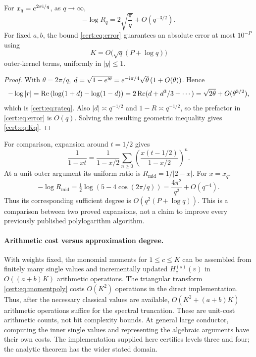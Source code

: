 \begin{corollary}
\label{cert:cor:conductor}
For $x_q=e^{2\pi\mathrm{i}/q}$, as $q\to\infty$,
\begin{equation}
 -\log R_q=2\sqrt{\frac\pi q}+O(q^{-3/2}).
\label{cert:eq:rateq}
\end{equation}
For fixed $a,b$, the bound \eqref{cert:eq:error} guarantees an absolute error
at most $10^{-P}$ using
\begin{equation}
 K=O\bigl(\sqrt q(P+\log q)\bigr)
\label{cert:eq:Kq}
\end{equation}
outer-kernel terms, uniformly in $|y|\le1$.
\end{corollary}
\begin{proof}
With $\theta=2\pi/q$,
$d=\sqrt{1-e^{\mathrm{i}\theta}}
=e^{-\mathrm{i}\pi/4}\sqrt\theta\,(1+O(\theta))$.
Hence
\[
 -\log|r|=\operatorname{Re}\left(\log(1+d)-\log(1-d)\right)
 =2\operatorname{Re}(d+d^3/3+\cdots)
 =\sqrt{2\theta}+O(\theta^{3/2}),
\]
which is \eqref{cert:eq:rateq}. Also $|d|\asymp q^{-1/2}$ and
$1-R\asymp q^{-1/2}$, so the prefactor in \eqref{cert:eq:error} is $O(q)$.
Solving the resulting geometric inequality gives \eqref{cert:eq:Kq}.
\end{proof}

For comparison, expansion around $t=1/2$ gives
\[
 \frac1{1-xt}=\frac1{1-x/2}
 \sum_{n\ge0}\left(\frac{x(t-1/2)}{1-x/2}\right)^n.
\]
At a unit outer argument its uniform ratio is
$R_{\mathrm{mid}}=1/|2-x|$. For $x=x_q$,
\begin{equation}
 -\log R_{\mathrm{mid}}
 =\tfrac12\log(5-4\cos(2\pi/q))
 =\frac{4\pi^2}{q^2}+O(q^{-4}).
\label{cert:eq:midrate}
\end{equation}
Thus its corresponding sufficient degree is
$O(q^2(P+\log q))$. This is a comparison between two proved expansions,
not a claim to improve every previously published polylogarithm algorithm.

\paragraph{Arithmetic cost versus approximation degree.}
With weights fixed, the monomial moments for $1\le c\le K$ can be
assembled from finitely many single values and incrementally updated
$H_c^{(s)}(v)$ in $O((a+b)K)$ arithmetic operations.
The triangular transform \eqref{cert:eq:momentpoly} costs $O(K^2)$ operations
in the direct implementation. Thus, after the necessary classical values
are available, $O(K^2+(a+b)K)$ arithmetic operations suffice for the
spectral truncation. These are unit-cost arithmetic counts, not bit
complexity bounds. At general large conductor, computing the inner single
values and representing the algebraic arguments have their own costs.
The implementation supplied here certifies levels three and four; the
analytic theorem has the wider stated domain.

